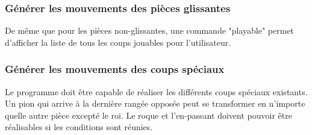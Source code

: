 \huge\documentclass{article}
\begin{document}
    \subsubsection{Générer les mouvements des pièces glissantes}
    De même que pour les pièces non-glissantes, une commande "playable" permet d'afficher la liste de tous les coups jouables pour l'utilisateur.

    \subsubsection{Générer les mouvements des coups spéciaux}
    Le programme doit être capable de réaliser les différents coups spéciaux existants. Un pion qui arrive à la dernière rangée opposée peut se transformer en n'importe quelle autre pièce excepté le roi. Le roque et l'en-passant doivent pouvoir être réalisables si les conditions sont réunies.
\end{document}
